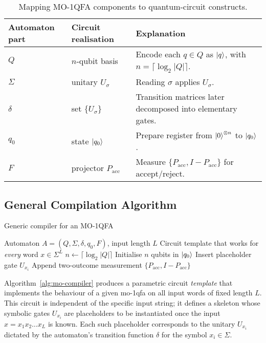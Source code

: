 \vspace{6pt}
\begin{table}[ht]
\centering
\footnotesize
\begin{tabularx}{\textwidth}{>{\raggedright\arraybackslash}p{}%
                        >{\raggedright\arraybackslash}p{}X}
\toprule
\textbf{Automaton part} & \textbf{Circuit realisation} & \textbf{Explanation}\\
\midrule
$Q$          & $n$-qubit basis        & Encode each $q\in Q$ as $\ket{q}$, with $n=\lceil\log_2|Q|\rceil$.\\
$\Sigma$     & unitary $U_\sigma$     & Reading $\sigma$ applies $U_\sigma$.\\
$\delta$     & set $\{U_\sigma\}$     & Transition matrices later decomposed into elementary gates.\\
$q_0$        & state $\ket{q_0}$      & Prepare register from $\ket{0}^{\otimes n}$ to $\ket{q_0}$.\\
$F$          & projector $P_{\text{acc}}$ & Measure $\{P_{\text{acc}},I-P_{\text{acc}}\}$ for accept/reject.\\
\bottomrule
\end{tabularx}
\caption{Mapping MO-1QFA components to quantum-circuit constructs.}
\label{tab:moqfa-mapping-new}
\end{table}

\subsection{General Compilation Algorithm}

\begin{algorithm}[H]
\caption{Generic compiler for an MO-1QFA}
\label{alg:mo-compiler}
\begin{algorithmic}[1]
\Require Automaton $A=(Q,\Sigma,\delta,q_0,F)$,\; input length $L$
\Ensure Circuit template that works for \emph{every} word $x\in\Sigma^L$
\State $n\gets\lceil\log_2|Q|\rceil$
\State Initialise $n$ qubits in $\ket{q_0}$
   \State Insert placeholder gate $\boxed{U_{x_i}}$
\EndFor
\State Append two-outcome measurement $\{P_{\text{acc}},I-P_{\text{acc}}\}$
\end{algorithmic}
\end{algorithm}
Algorithm~\ref{alg:mo-compiler} produces a parametric circuit \emph{template} that implements the behaviour of a given \gls{mo-1qfa} on all input words of fixed length $L$. This circuit is independent of the specific input string; it defines a skeleton whose symbolic gates $\boxed{U_{x_i}}$ are placeholders to be instantiated once the input $x = x_1x_2\dots x_L$ is known. Each such placeholder corresponds to the unitary $U_{x_i}$ dictated by the automaton’s transition function $\delta$ for the symbol $x_i \in \Sigma$.

